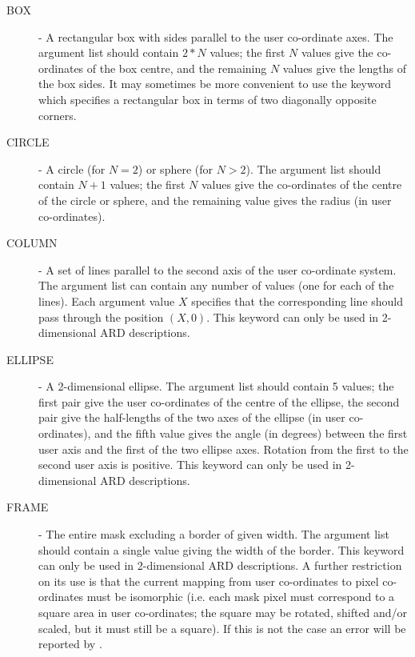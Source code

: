 \begin{description}

\item [\label{KEY:BOX}BOX] - A rectangular box with sides parallel to the
user co-ordinate axes. The argument list should contain $2*N$ values; the
first $N$ values give the co-ordinates of the box centre, and the
remaining $N$ values give the lengths of the box sides. It may sometimes
be more convenient to use the  keyword which specifies 
a rectangular box in terms of two diagonally opposite corners. 

\item [\label{KEY:CIR}CIRCLE] - A circle (for $N=2$) or sphere (for $N>2$).
The argument list should contain $N+1$ values; the first $N$ values give
the co-ordinates of the centre of the circle or sphere, and the remaining
value gives the radius (in user co-ordinates).

\item [\label{KEY:COL}COLUMN] - A set of lines parallel to the second
axis of the user co-ordinate system. The argument list can contain any number 
of values (one for each of the lines). Each argument value $X$ specifies that 
the corresponding line should pass through the position $(X,0)$. This keyword 
can only be used in 2-dimensional ARD descriptions.

\item [\label{KEY:ELL}ELLIPSE] - A 2-dimensional ellipse. The argument list 
should contain 5 values; the first pair give the user co-ordinates of
the centre of the ellipse, the second pair give the half-lengths of the
two axes of the ellipse (in user co-ordinates), and the fifth value gives
the angle (in degrees) between the first user axis and the first of the two
ellipse axes. Rotation from the first to the second user axis is positive. 
This keyword can only be used in 2-dimensional ARD descriptions.

\item [\label{KEY:FRA}FRAME] - The entire mask excluding a border of given 
width. The argument list should contain a single value giving the width
of the border. This keyword can only be used in 2-dimensional ARD
descriptions. A further restriction on its use is that the current
mapping from user co-ordinates to pixel co-ordinates must be isomorphic
(i.e. each mask pixel must correspond to a square area in user
co-ordinates; the square may be rotated, shifted and/or scaled, but it
must still be a square). If this is not the case an error will be
reported by .


\end{description}
